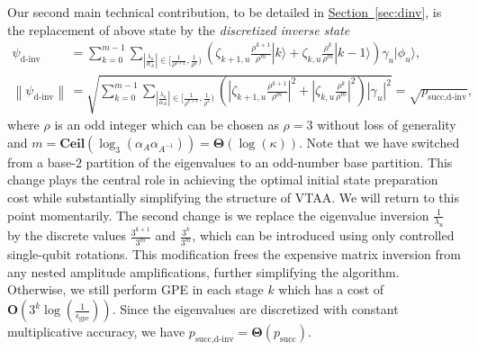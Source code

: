 \documentclass[letterpaper,onecolumn,11pt,accepted=2026-02-14]{quantumarticle}
\newcommand{\abs}[1]{\left\lvert#1\right\rvert}
\newcommand{\norm}[1]{\left\lVert#1\right\rVert}
\theoremstyle{remark}
\theoremstyle{plain}
\renewcommand{\sec}[1]{\hyperref[sec:#1]{Section~\ref*{sec:#1}}}
\newcommand{\ket}[1]{|#1\rangle}
\begin{document}
Our second main technical contribution, to be detailed in \sec{dinv}, is the replacement of above state by the \emph{discretized inverse state}
\begin{equation}
\begin{aligned}
    \psi_{\text{d-inv}}&=
    \sum_{k=0}^{m-1}\sum_{\abs{\frac{\lambda_u}{\alpha_A}}\in\big[\frac{1}{\rho^{k+1}},\frac{1}{\rho^k}\big)}
    \left(\zeta_{k+1,u}\frac{\rho^{k+1}}{\rho^m}\ket{k}+\zeta_{k,u}\frac{\rho^k}{\rho^m}\ket{k-1}\right)\gamma_u\ket{\phi_u},\\
    \norm{\psi_{\text{d-inv}}}&=\sqrt{\sum_{k=0}^{m-1}\sum_{\abs{\frac{\lambda_u}{\alpha_A}}\in\big[\frac{1}{\rho^{k+1}},\frac{1}{\rho^k}\big)}
    \left(\abs{\zeta_{k+1,u}\frac{\rho^{k+1}}{\rho^m}}^2+\abs{\zeta_{k,u}\frac{\rho^k}{\rho^m}}^2\right)\abs{\gamma_u}^2}=\sqrt{p_{\text{succ,d-inv}}},
\end{aligned}
\end{equation}
where $\rho$ is an odd integer which can be chosen as $\rho=3$ without loss of generality and $m=\mathbf{Ceil}\left(\log_3\left(\alpha_A\alpha_{A^{-1}}\right)\right)=\mathbf{\Theta}(\log(\kappa))$. 
Note that we have switched from a base-$2$ partition of the eigenvalues to an odd-number base partition. 
This change plays the central role in achieving the optimal initial state preparation cost while substantially simplifying the structure of VTAA. We will return to this point momentarily.
The second change is we replace the eigenvalue inversion $\frac{1}{\lambda_u}$ by the discrete values $\frac{3^{k+1}}{3^m}$ and $\frac{3^k}{3^m}$, which can be introduced using only controlled single-qubit rotations. This modification frees the expensive matrix inversion from any nested amplitude amplifications, further simplifying the algorithm. Otherwise, we still perform GPE in each stage $k$ which has a cost of $\mathbf{O}\left(3^k\log\left(\frac{1}{\epsilon_{\text{gpe}}}\right)\right)$.
Since the eigenvalues are discretized with constant multiplicative accuracy, we have $p_{\text{succ,d-inv}}=\mathbf{\Theta}(p_{\text{succ}})$.
\end{document}
